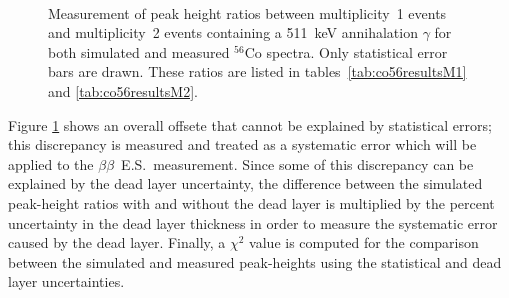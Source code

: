 \documentclass[notitlepage,rmp,aps,10pt]{revtex4-1}
\newcommand{\bb}{${\beta \beta}$}
\newcommand{\bbes}{\bb~E.S.}
\newcommand{\iso}[2]{$^{#1}$#2}
\newcommand{\Co}[1]{\iso{#1}{Co}}
\begin{document}
\begin{figure}[t]
  \centering
  \\
  \caption[Peak height ratio comparison results for module 1 and module 2]{\label{fig:co56results}
    Measurement of peak height ratios between multiplicity~1 events and multiplicity~2 events containing a 511~keV annihalation $\gamma$ for both simulated and measured \Co{56} spectra. Only statistical error bars are drawn. These ratios are listed in tables~\ref{tab:co56resultsM1} and \ref{tab:co56resultsM2}.
  }
\end{figure}
Figure \ref{fig:co56results} shows an overall offsete that cannot be explained by statistical errors; this discrepancy is measured and treated as a systematic error which will be applied to the \bbes\ measurement.
Since some of this discrepancy can be explained by the dead layer uncertainty, the difference between the simulated peak-height ratios with and without the dead layer is multiplied by the percent uncertainty in the dead layer thickness in order to measure the systematic error caused by the dead layer.
Finally, a $\chi^2$ value is computed for the comparison between the simulated and measured peak-heights using the statistical and dead layer uncertainties.
\end{document}
